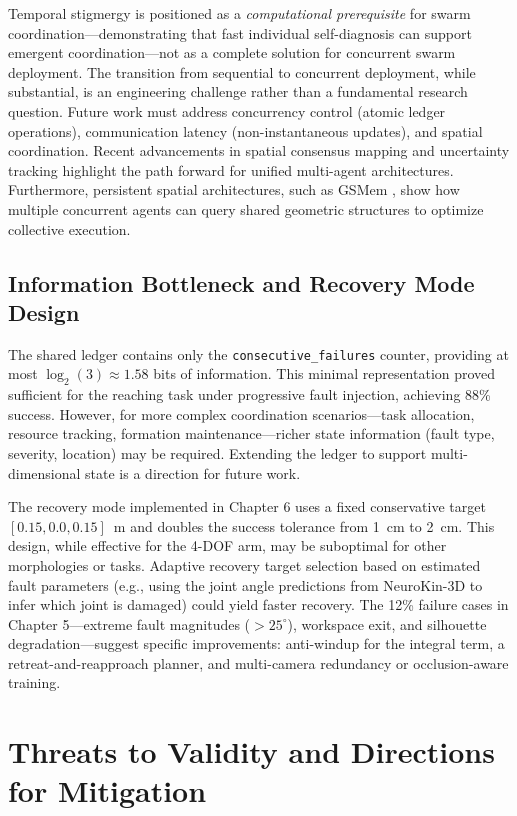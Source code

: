 \documentclass[12pt,a4paper,oneside]{report}
\begin{document}
Temporal stigmergy is positioned as a \textit{computational prerequisite} for swarm coordination---demonstrating that fast individual self-diagnosis can support emergent coordination---not as a complete solution for concurrent swarm deployment. The transition from sequential to concurrent deployment, while substantial, is an engineering challenge rather than a fundamental research question. Future work must address concurrency control (atomic ledger operations), communication latency (non-instantaneous updates), and spatial coordination. Recent advancements in spatial consensus mapping \cite{sun2026digitaltwin} and uncertainty tracking \cite{thirgood2025featureslam, tran2025varsplat} highlight the path forward for unified multi-agent architectures. Furthermore, persistent spatial architectures, such as GSMem \cite{lu2025gsmem}, show how multiple concurrent agents can query shared geometric structures to optimize collective execution.

\subsection{Information Bottleneck and Recovery Mode Design}
The shared ledger contains only the \texttt{consecutive\_failures} counter, providing at most $\log_2(3) \approx 1.58$ bits of information. This minimal representation proved sufficient for the reaching task under progressive fault injection, achieving 88\% success. However, for more complex coordination scenarios---task allocation, resource tracking, formation maintenance---richer state information (fault type, severity, location) may be required. Extending the ledger to support multi-dimensional state is a direction for future work.

The recovery mode implemented in Chapter 6 uses a fixed conservative target $[0.15, 0.0, 0.15]$~m and doubles the success tolerance from 1~cm to 2~cm. This design, while effective for the 4-DOF arm, may be suboptimal for other morphologies or tasks. Adaptive recovery target selection based on estimated fault parameters (e.g., using the joint angle predictions from NeuroKin-3D to infer which joint is damaged) could yield faster recovery. The 12\% failure cases in Chapter 5---extreme fault magnitudes ($>25^\circ$), workspace exit, and silhouette degradation---suggest specific improvements: anti-windup for the integral term, a retreat-and-reapproach planner, and multi-camera redundancy or occlusion-aware training.

\section{Threats to Validity and Directions for Mitigation}
\label{sec:threats_to_validity}
\end{document}
